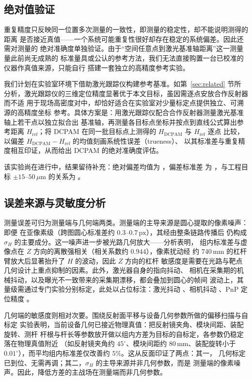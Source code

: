 \subsection{绝对值验证}

重复精度只反映同一位置多次测量的一致性，即测量的稳定性，却不能说明测得的距离
是否接近真值——一个系统可能重复性很好却存在稳定的系统偏差。因此还需对测量的
绝对准确度单独验证。由于“空间任意点到激光基准轴距离”这一测量量此前尚无成熟的
标准量具或公认的参考方法，我们无法直接购置一台已校准的仪器作真值来源，只能自行
搭建一套独立的高精度参考实验。

我们计划在实验室环境下借助激光跟踪仪构建参考基准。如第~\ref{sec:related} 节所
分析，激光跟踪仪的三维定位精度显著优于本文目标，虽因需逐点安放合作反射器而不适
用于现场高密度对中，却恰好适合在实验室对少量标定点提供独立、可溯源的高精度坐标
参考。具体方案是：用激光跟踪仪配合合作反射器测量激光基准轴上若干点以独立拟合出
基准轴，再测量各目标点坐标并按点到直线公式算出参考距离 $H_{\mathrm{ref}}$；将
DCPAM 在同一批目标点上测得的 $H_{\mathrm{DCPAM}}$ 与 $H_{\mathrm{ref}}$ 逐点
比较，以偏差 $H_{\mathrm{DCPAM}}-H_{\mathrm{ref}}$ 的均值刻画系统性误差（trueness）、
以其标准差与重复精度相互印证，从而给出 DCPAM 的绝对准确度评估。

该实验尚在进行中，结果留待补充：绝对偏差均值为 ，偏差标准差
为 ，与工程目标 $\pm15$--$50\,\mu\mathrm{m}$ 的关系为
。

\subsection{误差来源与灵敏度分析}

测量误差可归为测量端与几何端两类。测量端的主导来源是圆心提取的像素噪声：即便
在亚像素级（跨图圆心标准差约 $0.3$--$0.7\,\mathrm{px}$），其经由整条链路传播后
仍构成 $\hat{\sigma}_H$ 的主要成分。这一噪声进一步被光路几何放大——分析表明，
组内标准差与虚像点在 $Z$ 方向的离散强相关（相关系数约 $0.944$），像素扰动经
约 $740\,\mathrm{mm}$ 的杠杆臂放大后显著抬升了 $H$ 的波动，因此 $Z$ 方向的杠杆
敏感度是需要在光路与靶点几何设计上重点抑制的因素。此外，激光器自身的指向抖动、
相机在采集期的机械抖动，以及曝光不一致带来的采集期漂移，都会叠加到圆心的帧间
波动上，其量级需通过专门实验分别标定，此处以占位标注：激光抖动
、相机抖动 、PnP 定位精度
。

几何端的敏感度则相对次要。围绕反射面平移与设备几何参数所做的偏移扫描与自标定
实验表明，当前设备几何已接近物理真值：把反射镜夹角、模块间距、装配旋转、测杆
杆根与杆长等参数放开做以组内方差为目标的自标定，各参数仍稳定落在物理真值附近
（如反射镜夹角约 $45^\circ$、模块间距约 $80\,\mathrm{mm}$、装配旋转小于
$0.01^\circ$），而平均组内标准差仅改善约 $5\%$。这从反面印证了两点：其一，
几何标定已到位、无需再调；其二，$\hat{\sigma}_H$ 的主导来源并非几何参数，而是
测量端的像素噪声。因此，降低方差的主战场在测量端而非几何参数。

